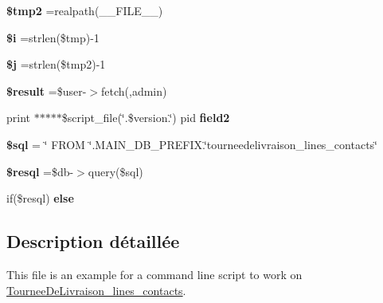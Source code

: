 \begin{DoxyCompactItemize}
\item 
\mbox{\label{tourneedelivraison__lines__contacts_8php_aed9bcb6730d1510376ce80e32bd9504d}} 
{\bfseries \$tmp2} =realpath(\+\_\+\+\_\+\+F\+I\+L\+E\+\_\+\+\_\+)
\item 
\mbox{\label{tourneedelivraison__lines__contacts_8php_a83018d9153d17d91fbcf3bc10158d34f}} 
{\bfseries \$i} =strlen(\$tmp)-\/1
\item 
\mbox{\label{tourneedelivraison__lines__contacts_8php_a6f16db779ef3ccea921b277b5dc245d1}} 
{\bfseries \$j} =strlen(\$tmp2)-\/1
\item 
\mbox{\label{tourneedelivraison__lines__contacts_8php_a112ef069ddc0454086e3d1e6d8d55d07}} 
{\bfseries \$result} =\$user-\/$>$fetch(\textquotesingle{}\textquotesingle{},\textquotesingle{}admin\textquotesingle{})
\item 
\mbox{\label{tourneedelivraison__lines__contacts_8php_af9edfce80596a171cfb2884ba7ad01df}} 
print $\ast$$\ast$$\ast$$\ast$$\ast$\$script\+\_\+file(\char`\"{}.\$version.\char`\"{}) pid {\bfseries field2}
\item 
\mbox{\label{tourneedelivraison__lines__contacts_8php_a047170d6020a882807665812a27e2525}} 
{\bfseries \$sql} = \char`\"{} F\+R\+OM \char`\"{}.M\+A\+I\+N\+\_\+\+D\+B\+\_\+\+P\+R\+E\+F\+I\+X.\char`\"{}tourneedelivraison\+\_\+lines\+\_\+contacts\char`\"{}
\item 
\mbox{\label{tourneedelivraison__lines__contacts_8php_a6adc5ef389ab51c21dee69262018d615}} 
{\bfseries \$resql} =\$db-\/$>$query(\$sql)
\item 
if(\$resql) {\bfseries else}
\end{DoxyCompactItemize}


\subsection{Description détaillée}
This file is an example for a command line script to work on \hyperlink{classTourneeDeLivraison__lines__contacts}{Tournee\+De\+Livraison\+\_\+lines\+\_\+contacts}. 



